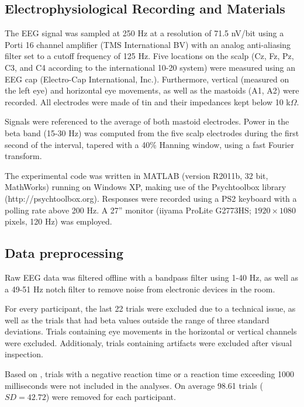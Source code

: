\documentclass[man,floatsintext]{apa6} %
\begin{document}
\subsection{Electrophysiological Recording and Materials}
The EEG signal was sampled at 250 Hz at a resolution of 71.5 nV/bit
using a Porti 16 channel amplifier (TMS International BV) with an
analog anti-aliasing filter set to a cutoff frequency of 125 Hz. Five
locations on the scalp (Cz, Fz, Pz, C3, and C4 according to the
international 10-20 system) were measured using an EEG cap
(Electro-Cap International, Inc.). Furthermore, vertical (measured on
the left eye) and horizontal eye movements, as well as the mastoids
(A1, A2) were recorded. All electrodes were made of tin and their
impedances kept below 10 k$\Omega$.

Signals were referenced to the average of both mastoid
electrodes. Power in the beta band (15-30 Hz) was computed from the
five scalp electrodes during the first second of the interval, tapered
with a 40\% Hanning window, using a fast Fourier transform.

The experimental code was written in MATLAB (version R2011b, 32 bit,
MathWorks) running on Windows XP, making use of the Psychtoolbox
library (http://psychtoolbox.org). Responses were recorded using a PS2
keyboard with a polling rate above 200 Hz. A 27'' monitor (iiyama
ProLite G2773HS; $1920 \times 1080$ pixels, 120 Hz) was employed.

\subsection{Data preprocessing}
Raw EEG data was filtered offline with a bandpass filter using 1-40
Hz, as well as a 49-51 Hz notch filter to remove noise from electronic
devices in the room.

For every participant, the last 22 trials were excluded due to a
technical issue, as well as the trials that had beta values outside
the range of three standard deviations. Trials containing eye
movements in the horizontal or vertical channels were
excluded. Additionaly, trials containing artifacts were excluded after
visual inspection.

Based on , trials with a negative reaction
time or a reaction time exceeding 1000 milliseconds were not included
in the analyses. On average 98.61 trials ($SD = 42.72$) were removed
for each participant.
\end{document}
